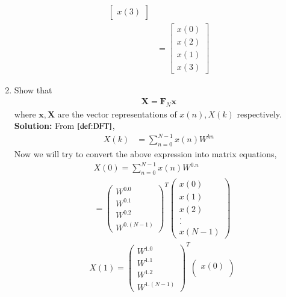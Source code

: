 \documentclass[journal,12pt,twocolumn]{IEEEtran}
\newcommand{\solution}{\noindent \textbf{Solution: }}
\let\vec\mathbf
\numberwithin{equation}{section}
\renewcommand\thesection{\arabic{section}}
\newcommand{\myvec}[1]{\ensuremath{\begin{pmatrix}#1\end{pmatrix}}}
\begin{document}
\begin{enumerate}[label=\arabic*.,ref=\thesection.\theenumi]
\begin{align}
\begin{bmatrix}
                              	x(3)
                              \end{bmatrix} \\
                          &= \begin{bmatrix}
                          	   x(0) \\
                          	   x(2) \\
                          	   x(1) \\
                          	   x(3)
                             \end{bmatrix} 
    \end{align}
\item Show that 
    \begin{align}
	    \vec{X} = \vec{F}_N \vec{x}
	    \label{eq:dft-mat-def}
    \end{align}
		where $\vec{x}, \vec{X}$ are the vector representations of $x(n), X(k)$ respectively.\\
\solution From $\eqref{def:DFT}$,
   \begin{align}
   	X(k) &= \sum_{n=0}^{N-1} x(n) W^{kn}
   \end{align}
  Now we will try to convert the above expression into matrix equations,
   \begin{align}
   	&X(0) = \sum_{n=0}^{N-1} x(n) W^{0.n} \\
   	     &= \myvec{W^{0.0}\\ W^{0.1} \\ W^{0.2} \\ W^{0.(N-1)}}^T\myvec{
   	     	                                                x(0)\\
   	     	                                                x(1)\\
   	     	                                                x(2)\\
   	     	                                                 .\\
   	     	                                                 .\\
   	     	                                                x(N-1)
   	     	                                               }
    \end{align}
    \begin{align}
   &X(1) = \myvec{W^{1.0} \\ W^{1.1} \\ W^{1.2} \\ W^{1.(N-1)}}^T\myvec{
                                                         	x(0)\\
}
\end{align}
\end{enumerate}
\end{document}
